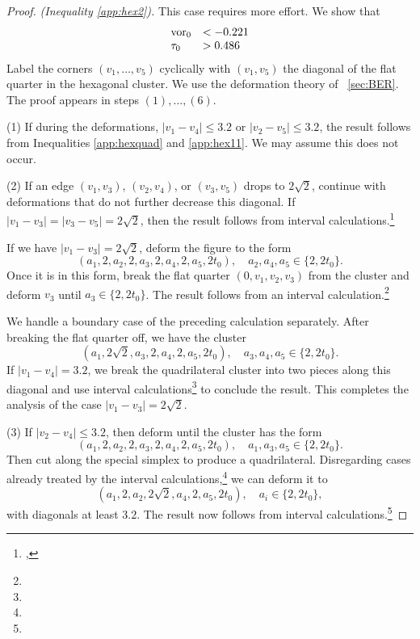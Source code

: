 \begin{proof}
{\it (Inequality \ref{app:hex2}).} This case requires more effort.
We show that
    $$
    \begin{array}{lll}
    \operatorname{vor}_0 &< -0.221\\
    \tau_0 &> 0.486\\
    \end{array}
    $$
Label the corners $(v_1,\ldots,v_5)$ cyclically with $(v_1,v_5)$ the
diagonal of the flat quarter in the hexagonal cluster. We use the
deformation theory of \Chap~\ref{sec:BER}.
The proof appears in
steps $(1),\ldots,(6)$.

(1) If during the deformations, $|v_1-v_4|\le3.2$ or
$|v_2-v_5|\le3.2$, the result follows from Inequalities
\ref{app:hexquad} and \ref{app:hex11}.  We may assume this does
not occur.

(2) If an edge $(v_1,v_3)$, $(v_2,v_4)$, or $(v_3,v_5)$ drops to
$2\sqrt2$, continue with deformations that do not further decrease
this diagonal. If $|v_1-v_3|=|v_3-v_5|=2\sqrt2$, then the result
follows from
interval calculations.\footnote{,} %

If we have $|v_1-v_3|=2\sqrt2$, deform the figure to the form
    $$(a_1,2,a_2,2,a_3,2,a_4,2,a_5,2t_0),\quad a_2,a_4,a_5\in\{2,2t_0\}.$$
Once it is in this form, break the flat quarter $(0,v_1,v_2,v_3)$
from the cluster and deform $v_3$ until $a_3\in\{2,2t_0\}$.  The
result follows from an interval calculation.\footnote{} %

We handle a boundary case of the preceding calculation separately.
After breaking the flat quarter off, we have the cluster
    $$(a_1,2\sqrt2,a_3,2,a_4,2,a_5,2t_0),\quad a_3,a_4,a_5\in\{2,2t_0\}.$$
If $|v_1-v_4|=3.2$, we break the quadrilateral cluster into two
pieces along this diagonal and use interval calculations\footnote{} %
to conclude the result. This completes the analysis
of the case $|v_1-v_3|=2\sqrt2$.

(3) If $|v_2-v_4|\le3.2$, then deform until the cluster has the
form
    $$(a_1,2,a_2,2,a_3,2,a_4,2,a_5,2t_0),\quad a_1,a_3,a_5\in\{2,2t_0\}.$$
Then cut along the special simplex to produce a quadrilateral.
Disregarding cases already treated by the interval calculations,\footnote{} %
we can deform it to
    $$(a_1,2,a_2,2\sqrt2,a_4,2,a_5,2t_0),\quad a_i\in\{2,2t_0\},$$
with diagonals at least $3.2$. The result now follows from
interval calculations.\footnote{} %


\end{proof}

